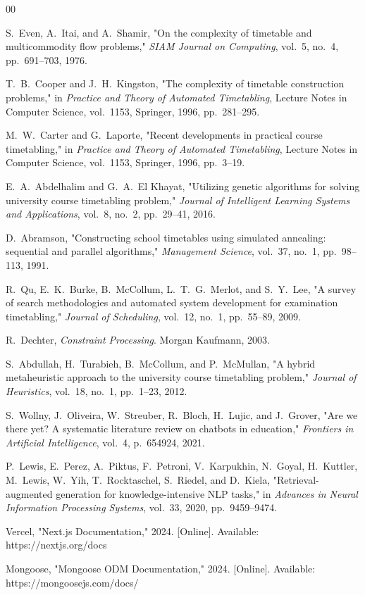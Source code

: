 \documentclass[conference]{IEEEtran}
\begin{document}
\begin{thebibliography}{00}

 S.\ Even, A.\ Itai, and A.\ Shamir, "On the complexity of timetable and multicommodity flow problems," \textit{SIAM Journal on Computing}, vol.\ 5, no.\ 4, pp.\ 691--703, 1976.

 T.\ B.\ Cooper and J.\ H.\ Kingston, "The complexity of timetable construction problems," in \textit{Practice and Theory of Automated Timetabling}, Lecture Notes in Computer Science, vol.\ 1153, Springer, 1996, pp.\ 281--295.

 M.\ W.\ Carter and G.\ Laporte, "Recent developments in practical course timetabling," in \textit{Practice and Theory of Automated Timetabling}, Lecture Notes in Computer Science, vol.\ 1153, Springer, 1996, pp.\ 3--19.

 E.\ A.\ Abdelhalim and G.\ A.\ El Khayat, "Utilizing genetic algorithms for solving university course timetabling problem," \textit{Journal of Intelligent Learning Systems and Applications}, vol.\ 8, no.\ 2, pp.\ 29--41, 2016.

 D.\ Abramson, "Constructing school timetables using simulated annealing: sequential and parallel algorithms," \textit{Management Science}, vol.\ 37, no.\ 1, pp.\ 98--113, 1991.

 R.\ Qu, E.\ K.\ Burke, B.\ McCollum, L.\ T.\ G.\ Merlot, and S.\ Y.\ Lee, "A survey of search methodologies and automated system development for examination timetabling," \textit{Journal of Scheduling}, vol.\ 12, no.\ 1, pp.\ 55--89, 2009.

 R.\ Dechter, \textit{Constraint Processing}. Morgan Kaufmann, 2003.

 S.\ Abdullah, H.\ Turabieh, B.\ McCollum, and P.\ McMullan, "A hybrid metaheuristic approach to the university course timetabling problem," \textit{Journal of Heuristics}, vol.\ 18, no.\ 1, pp.\ 1--23, 2012.

 S.\ Wollny, J.\ Oliveira, W.\ Streuber, R.\ Bloch, H.\ Lujic, and J.\ Grover, "Are we there yet? A systematic literature review on chatbots in education," \textit{Frontiers in Artificial Intelligence}, vol.\ 4, p.\ 654924, 2021.

 P.\ Lewis, E.\ Perez, A.\ Piktus, F.\ Petroni, V.\ Karpukhin, N.\ Goyal, H.\ Kuttler, M.\ Lewis, W.\ Yih, T.\ Rocktaschel, S.\ Riedel, and D.\ Kiela, "Retrieval-augmented generation for knowledge-intensive NLP tasks," in \textit{Advances in Neural Information Processing Systems}, vol.\ 33, 2020, pp.\ 9459--9474.

 Vercel, "Next.js Documentation," 2024. [Online]. Available: https://nextjs.org/docs

 Mongoose, "Mongoose ODM Documentation," 2024. [Online]. Available: https://mongoosejs.com/docs/

\end{thebibliography}
\end{document}
